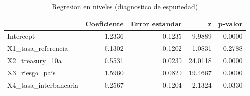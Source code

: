 \begin{table}
\caption{Regresion en niveles (diagnostico de espuriedad)}
\label{tab:tabla3_niveles}
\begin{tabular}{lrrrr}
\toprule
 & Coeficiente & Error estandar & z & p-valor \\
\midrule
Intercept & 1.2336 & 0.1235 & 9.9889 & 0.0000 \\
X1_tasa_referencia & -0.1302 & 0.1202 & -1.0831 & 0.2788 \\
X2_treasury_10a & 0.5531 & 0.0230 & 24.0118 & 0.0000 \\
X3_riesgo_pais & 1.5960 & 0.0820 & 19.4667 & 0.0000 \\
X4_tasa_interbancaria & 0.2567 & 0.1204 & 2.1324 & 0.0330 \\
\bottomrule
\end{tabular}
\end{table}
